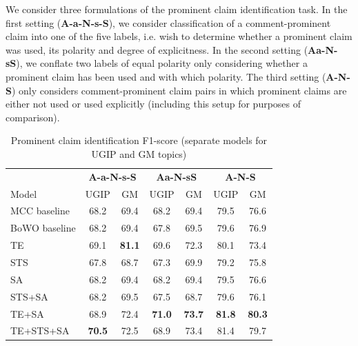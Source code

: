 We consider three formulations of the prominent claim identification task. 
In the first setting (\textbf{A-a-N-s-S}), we consider classification of a comment-prominent claim
into one of the five labels, i.e. wish to determine whether a prominent claim was used, 
its polarity and degree of explicitness. 
In the second setting (\textbf{Aa-N-sS}), we conflate two labels of equal polarity only considering
whether a prominent claim has been used and with which polarity. 
The third setting (\textbf{A-N-S}) only considers comment-prominent claim pairs
in which prominent claims are either not used or used explicitly (including
this setup for purposes of comparison). 

\begin{table}
\centering
{\small
\begin{tabular}{@{}l cc cc cc @{}}
\toprule
& 
\multicolumn{2}{c}{\textbf{A-a-N-s-S}} &
\multicolumn{2}{c}{\textbf{Aa-N-sS}} &
\multicolumn{2}{c}{\textbf{A-N-S}} \\
\cmidrule(lr){2-3}
\cmidrule(lr){4-5}
\cmidrule(lr){6-7}
Model & UGIP & GM & UGIP & GM & UGIP & GM \\ 
\midrule
MCC baseline  & 68.2 & 69.4 & 68.2 & 69.4  & 79.5 & 76.6        \\
BoWO baseline & 68.2 & 69.4 & 67.8 & 69.5 & 79.6 & 76.9        \\[1ex]
TE            & 69.1 & \textbf{81.1} & 69.6 & 72.3 & 80.1 & 73.4        \\
STS           & 67.8 & 68.7 & 67.3 & 69.9 & 79.2 & 75.8        \\
SA            & 68.2 & 69.4 & 68.2 & 69.4 & 79.5 & 76.6        \\[1ex]
STS+SA        & 68.2 & 69.5 & 67.5 & 68.7 & 79.6 & 76.1         \\
TE+SA         & 68.9 & 72.4 & \textbf{71.0} & \textbf{73.7} & \textbf{81.8} & \textbf{80.3}    \\[1ex]
TE+STS+SA   & \textbf{70.5} & 72.5 & 68.9 & 73.4 & 81.4 & 79.7        \\
\bottomrule
\end{tabular}}
\caption{Prominent claim identification F1-score (separate models for UGIP and GM topics)}
\label{tab:claim_identification_results}
\end{table}

